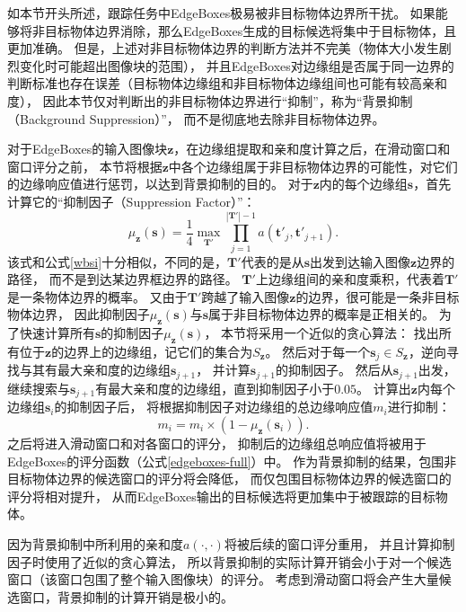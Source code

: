 如本节开头所述，跟踪任务中EdgeBoxes极易被非目标物体边界所干扰。
如果能够将非目标物体边界消除，那么EdgeBoxes生成的目标候选将集中于目标物体，且更加准确。
但是，上述对非目标物体边界的判断方法并不完美（物体大小发生剧烈变化时可能超出图像块的范围），
并且EdgeBoxes对边缘组是否属于同一边界的判断标准也存在误差（目标物体边缘组和非目标物体边缘组间也可能有较高亲和度），
因此本节仅对判断出的非目标物体边界进行``抑制''，称为``背景抑制（Background Suppression）''，
而不是彻底地去除非目标物体边界。

对于EdgeBoxes的输入图像块$\mathbf{z}$，在边缘组提取和亲和度计算之后，在滑动窗口和窗口评分之前，
本节将根据$\mathbf{z}$中各个边缘组属于非目标物体边界的可能性，对它们的边缘响应值进行惩罚，以达到背景抑制的目的。
对于$\mathbf{z}$内的每个边缘组$\textbf{s}$，首先计算它的``抑制因子（Suppression Factor）''：
\begin{equation}
\mu_\mathbf{z}(\textbf{s})=\frac{1}{4}\max_{\textbf{T}'}{\prod_{j=1}^{|\textbf{T}'|-1}a(\textbf{t}'_j,\textbf{t}'_{j+1})}. \label{sup_factor}
\end{equation}
该式和公式\ref{wbsi}十分相似，不同的是，$\textbf{T}'$代表的是从$\textbf{s}$出发到达输入图像$\mathbf{z}$边界的路径，
而不是到达某边界框边界的路径。
$\textbf{T}'$上边缘组间的亲和度乘积，代表着$\textbf{T}'$是一条物体边界的概率。
又由于$\textbf{T}'$跨越了输入图像$\mathbf{z}$的边界，很可能是一条非目标物体边界，
因此抑制因子$\mu_\mathbf{z}(\textbf{s})$与$\textbf{s}$属于非目标物体边界的概率是正相关的。
为了快速计算所有$\textbf{s}$的抑制因子$\mu_\mathbf{z}(\textbf{s})$，
本节将采用一个近似的贪心算法：
找出所有位于$\mathbf{z}$的边界上的边缘组，记它们的集合为$S_{\mathbf{z}}$。
然后对于每一个$\textbf{s}_j\in S_{\mathbf{z}}$，逆向寻找与其有最大亲和度的边缘组$\textbf{s}_{j+1}$，
并计算$\textbf{s}_{j+1}$的抑制因子。
然后从$\textbf{s}_{j+1}$出发，继续搜索与$\textbf{s}_{j+1}$有最大亲和度的边缘组，直到抑制因子小于$0.05$。
计算出$\mathbf{z}$内每个边缘组$\textbf{s}_i$的抑制因子后，
将根据抑制因子对边缘组的总边缘响应值$m_i$进行抑制：
\begin{equation}
m_i=m_i\times(1-\mu_\mathbf{z}(\textbf{s}_i)). \label{sup_pixel}
\end{equation}
之后将进入滑动窗口和对各窗口的评分，
抑制后的边缘组总响应值将被用于EdgeBoxes的评分函数（公式\ref{edgeboxes-full}）中。
作为背景抑制的结果，包围非目标物体边界的候选窗口的评分将会降低，
而仅包围目标物体边界的候选窗口的评分将相对提升，
从而EdgeBoxes输出的目标候选将更加集中于被跟踪的目标物体。

因为背景抑制中所利用的亲和度$a(\cdot, \cdot)$将被后续的窗口评分重用，
并且计算抑制因子时使用了近似的贪心算法，
所以背景抑制的实际计算开销会小于对一个候选窗口（该窗口包围了整个输入图像块）的评分。
考虑到滑动窗口将会产生大量候选窗口，背景抑制的计算开销是极小的。

